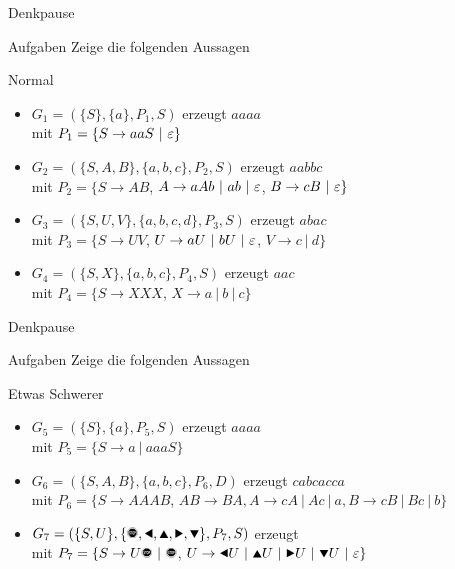 {
\begin{frame}{Denkpause}
    \begin{alertblock}{Aufgaben}
        Zeige die folgenden Aussagen
    \end{alertblock}
    \begin{block}{Normal}
        \begin{itemize}
            \item $G_1=(\{S\}, \{a\}, P_1, S)$ erzeugt $aaaa$\\
            mit $P_1=\{S\rightarrow aaS\ |\ \emptyWord\}$
            \item $G_2=(\{S,A,B\}, \{a,b,c\}, P_2, S)$ erzeugt $aabbc$\\
            mit $P_2=\{S\rightarrow AB$, $A\rightarrow aAb \ |\ ab\ |\ \emptyWord$, $B\rightarrow cB \ |\  \emptyWord\}$ 
            \item $G_3=(\{S,U,V\}, \{a,b,c,d\}, P_3, S)$ erzeugt $abac$\\
            mit $P_3=\{S\rightarrow UV$, $U\rightarrow aU \ |\  bU \ |\  \emptyWord$, $V\rightarrow c \ |\  d\}$
            \item $G_4=(\{S,X\}, \{a,b,c\}, P_4, S)$ erzeugt $aac$\\
            mit $P_4=\{S\rightarrow XXX$, $X\rightarrow a \ |\  b \ |\  c\}$
        \end{itemize}
    \end{block}
\end{frame}
\begin{frame}{Denkpause}
    \begin{alertblock}{Aufgaben}
        Zeige die folgenden Aussagen
    \end{alertblock}
    \begin{block}{Etwas Schwerer}
        \begin{itemize}
            \item $G_5=(\{S\}, \{a\}, P_5, S)$ erzeugt $aaaa$\\
            mit $P_5=\{S\rightarrow a \ |\  aaaS\}$
            \item $G_6=(\{S,A,B\}, \{a,b,c\}, P_6, D)$ erzeugt $cabcacca$\\
            mit $P_6=\{S\rightarrow AAAB$, $AB\rightarrow BA,
                      A\rightarrow cA \ |\  Ac \ |\ a,
                      B\rightarrow cB \ |\  Bc \ |\  b\}$ 
            \item $G_7=(\{S,U\}, \{\text{\Stopsign},\text{\Rewind},\text{\MoveUp},\text{\Forward},\text{\MoveDown}\}, P_7, S)$  erzeugt \Forward\Stopsign\\
            mit $P_7=\{S\rightarrow U\text{\Stopsign} \ |\  \text{\Stopsign}$, $U\rightarrow \text{\Rewind} U \ |\  \text{\MoveUp} U \ |\  \text{\Forward} U \ |\  \text{\MoveDown} U \ |\ \emptyWord\}$
        \end{itemize}
    \end{block}
\end{frame}
}


